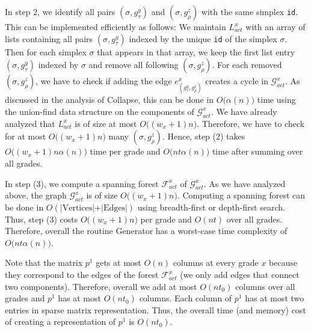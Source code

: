 \documentclass[english,a4paper,nolineno,cleveref]{socg-lipics-v2021}
\newcommand{\F}{\mathcal F}
\begin{document}
In step 2, we identify all pairs $(\sigma,g^y_\tau)$ and $(\sigma,g_\rho^z)$ with the same simplex \texttt{id}. This can be implemented efficiently as follows: We maintain $L_{act}^{x}$ with an array of lists containing all pairs $(\sigma, g_\tau^y)$ indexed by the unique \texttt{id} of the simplex $\sigma$. Then for each simplex $\sigma$ that appears in that array, we keep the first list entry $(\sigma,g^y_\tau)$ indexed by $\sigma$ and remove all following $(\sigma,g_\rho^z)$. For each removed $(\sigma,g_\rho^z)$, we have to check if adding the edge $e^{x}_{(g_\tau^y,g_\rho^z)}$ creates a cycle in $\mathcal{G}_{act}^x$. As discussed in the analysis of {\sc Collapse}, this can be done in $O\big(\alpha(n)\big)$ time using the union-find data structure on the components of $\mathcal{G}_{act}^x$. We have already analyzed that $L_{act}^x$ is of size at most $O\big((w_x+1)n\big)$. Therefore, we have to check for at most $O\big((w_x+1)n\big)$ many $(\sigma,g_\rho^z)$. Hence, step (2) takes $O\big((w_x+1)n\alpha(n)\big)$ time per grade and $O\big(nt\alpha(n)\big)$ time after summing over all grades. 

In step (3), we compute a spanning forest $\mathcal{F}_{act}^x$ of $\mathcal{G}_{act}^x$. As we have analyzed above, the graph $\mathcal{G}_{act}^x$ is of size $O\big((w_x+1)n\big)$. Computing a spanning forest can be done in $O(\vert\text{Vertices}\vert+\vert\text{Edges}\vert)$ using breadth-first or depth-first search. Thus, step (3) costs $O\big( (w_x+1)n\big)$ per grade and $O(nt)$ over all grades. Therefore, overall the routine {\sc Generator} has a worst-case time complexity of $O\big(nt\alpha(n)\big)$. 

Note that the matrix $p^1$ gets at most $O(n)$ columns at every grade $x$
because they correspond to the edges of the forest $\F^{x}_{act}$ (we only add edges that connect two components). Therefore, overall we add at most $O(nt_0)$ columns over all grades and $p^1$ has at most $O(nt_0)$ columns. Each column of $p^1$ has at most two entries in sparse matrix representation. Thus, the overall time (and memory) cost of creating a representation of $p^1$ is $O(nt_0)$. 
\end{document}
